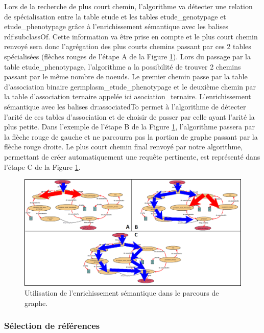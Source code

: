 Lors de la recherche de plus court chemin, l'algorithme va détecter une relation de spécialisation entre la table etude et les tables etude\_genotypage et etude\_phenotypage grâce à l'enrichissement sémantique avec les balises rdf:subclassOf. Cette information va être prise en compte et le plus court chemin renvoyé sera donc l'agrégation des plus courts chemins passant par ces 2 tables spécialisées (flèches rouges de l'étape A de la Figure \ref{parcours}). Lors du passage par la table etude\_phenotypage, l'algorithme a la possibilité de trouver 2 chemins passant par le même nombre de noeuds. Le premier chemin passe par la table d'association binaire germplasm\_etude\_phenotypage et le deuxième chemin par la table d'association ternaire appelée ici asociation\_ternaire. L'enrichissement sémantique avec les balises dr:associatedTo permet à l'algorithme de détecter l'arité de ces tables d'association et de choisir de passer par celle ayant l'arité la plus petite. Dans l'exemple de l'étape B de la Figure \ref{parcours}, l'algorithme passera par la flèche rouge de gauche et ne parcourra pas la portion de graphe passant par la flèche rouge droite. Le plus court chemin final renvoyé par notre algorithme, permettant de créer automatiquement une requête pertinente, est représenté dans l'étape C de la Figure \ref{parcours}.


\begin{figure}[!ht]
\begin{center}
	\includegraphics[width=1\textwidth]{Figures/biosemantic4.png}
\end{center}
\caption{\label{parcours} Utilisation de l'enrichissement sémantique dans le parcours de graphe.}
\end{figure}

\subsubsection*{Sélection de références}

